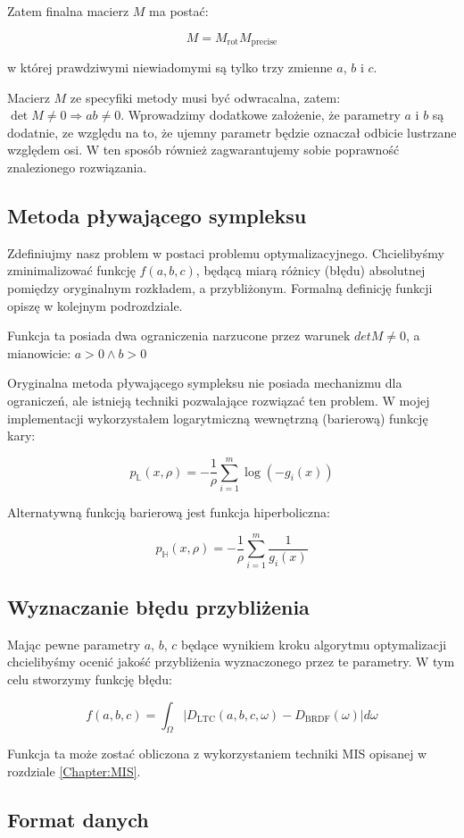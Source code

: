 \documentclass[../main.tex]{subfiles}
\begin{document}
Zatem finalna macierz $M$ ma postać:

$$
M = M_{\text{rot}} M_{\text{precise}}
$$

w której prawdziwymi niewiadomymi są tylko trzy zmienne $a$, $b$ i $c$.

Macierz $M$ ze specyfiki metody musi być odwracalna, zatem:
  $\det M \neq 0 \Rightarrow ab \neq 0$.
Wprowadzimy dodatkowe założenie, że parametry $a$ i $b$ są dodatnie, ze względu
na to, że ujemny parametr będzie oznaczał odbicie lustrzane względem osi.
W ten sposób również zagwarantujemy sobie poprawność znalezionego rozwiązania.

\subsection{Metoda pływającego sympleksu}

Zdefiniujmy nasz problem w postaci problemu optymalizacyjnego. Chcielibyśmy
zminimalizować funkcję $f(a,b,c)$, będącą miarą różnicy (błędu) absolutnej
pomiędzy oryginalnym rozkładem, a przybliżonym. Formalną definicję funkcji
opiszę w kolejnym podrozdziale.

Funkcja ta posiada dwa ograniczenia narzucone przez warunek $detM \neq 0$,
a mianowicie:
  $a > 0 \wedge b > 0$

Oryginalna metoda pływającego sympleksu nie posiada mechanizmu dla ograniczeń,
ale istnieją techniki pozwalające rozwiązać ten problem. W mojej implementacji
wykorzystałem logarytmiczną wewnętrzną (barierową) funkcję kary:

\[
  p_{\mathbb{L}}(x, \rho) = - \frac{1}{\rho} \sum_{i=1}^{m} \log(-g_i(x))
\]

Alternatywną funkcją barierową jest funkcja hiperboliczna:

\[
  p_{\mathbb{H}}(x, \rho) =
    - \frac{1}{\rho} \sum_{i=1}^{m} \frac{1}{g_i(x)}
\]

\subsection{Wyznaczanie błędu przybliżenia}

Mając pewne parametry $a$, $b$, $c$ będące wynikiem kroku algorytmu optymalizacji
chcielibyśmy ocenić jakość przybliżenia wyznaczonego przez te parametry. W tym
celu stworzymy funkcję błędu:

\[
  f(a,b,c) =
    \int_{\Omega} {
      \left| {D_{\text{LTC}}(a, b, c, \omega) - D_{\text{BRDF}}(\omega)} \right|
    } d \omega
\]

Funkcja ta może zostać obliczona z wykorzystaniem techniki MIS opisanej w
rozdziale \ref{Chapter:MIS}.

\subsection{Format danych}
\end{document}

